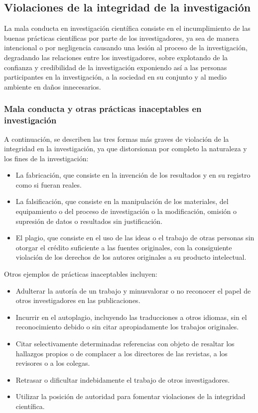 \subsection{Violaciones de la integridad de la investigación}
La mala conducta en investigación científica consiste en el incumplimiento de las buenas prácticas
científicas por parte de los investigadores, ya sea de manera intencional o por negligencia causando 
una lesión al proceso de la investigación, degradando las relaciones entre los investigadores, sobre explotando de la confianza
y credibilidad de la investigación exponiendo así a las personas participantes en la investigación, a la sociedad en su conjunto y al medio 
ambiente en daños innecesarios.
\subsubsection{Mala conducta y otras prácticas inaceptables en investigación}
A continuación, se describen las tres formas más graves de violación de la integridad en la
investigación, ya que distorsionan por completo la naturaleza y los fines de la investigación:
\begin{itemize}
    \item La fabricación, que consiste en la invención de los resultados y en su registro como si fueran
    reales.
    \item La falsificación, que consiste en la manipulación de los materiales, del equipamiento o del proceso
    de investigación o la modificación, omisión o supresión de datos o resultados sin justificación.
    \item El plagio, que consiste en el uso de las ideas o el trabajo de otras personas sin otorgar el crédito
    suficiente a las fuentes originales, con la consiguiente violación de los derechos de los autores
    originales a su producto intelectual.
\end{itemize}
Otros ejemplos de prácticas inaceptables incluyen:
\begin{itemize}
    \item Adulterar la autoría de un trabajo y minusvalorar o no reconocer el papel de otros investigadores
    en las publicaciones.
    \item Incurrir en el autoplagio, incluyendo las traducciones a otros idiomas, sin el reconocimiento
    debido o sin citar apropiadamente los trabajos originales.
    \item Citar selectivamente determinadas referencias con objeto de resaltar los hallazgos propios o de
    complacer a los directores de las revistas, a los revisores o a los colegas.
    \item Retrasar o dificultar indebidamente el trabajo de otros investigadores.
    \item Utilizar la posición de autoridad para fomentar violaciones de la integridad científica.
\end{itemize}